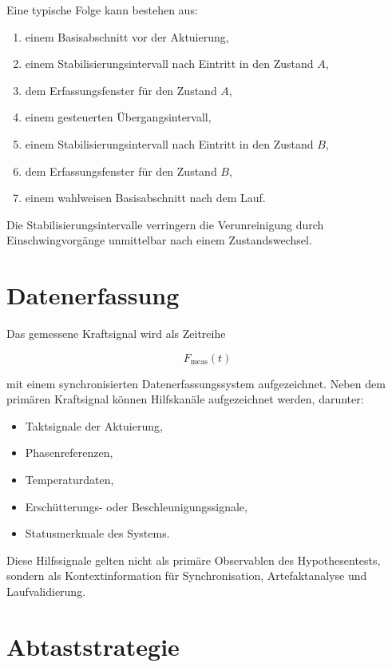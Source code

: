 \documentclass[12pt,a4paper]{report}
\begin{document}
Eine typische Folge kann bestehen aus:

\begin{enumerate}
\item einem Basisabschnitt vor der Aktuierung,
\item einem Stabilisierungsintervall nach Eintritt in den Zustand $A$,
\item dem Erfassungsfenster für den Zustand $A$,
\item einem gesteuerten Übergangsintervall,
\item einem Stabilisierungsintervall nach Eintritt in den Zustand $B$,
\item dem Erfassungsfenster für den Zustand $B$,
\item einem wahlweisen Basisabschnitt nach dem Lauf.
\end{enumerate}

Die Stabilisierungsintervalle verringern die Verunreinigung durch
Einschwingvorgänge unmittelbar nach einem Zustandswechsel.

\section{Datenerfassung}

Das gemessene Kraftsignal wird als Zeitreihe

\begin{equation}
F_{\text{meas}}(t)
\end{equation}

mit einem synchronisierten Datenerfassungssystem aufgezeichnet. Neben dem
primären Kraftsignal können Hilfskanäle aufgezeichnet werden, darunter:

\begin{itemize}
\item Taktsignale der Aktuierung,
\item Phasenreferenzen,
\item Temperaturdaten,
\item Erschütterungs- oder Beschleunigungssignale,
\item Statusmerkmale des Systems.
\end{itemize}

Diese Hilfssignale gelten nicht als primäre Observablen des
Hypothesentests, sondern als Kontextinformation für Synchronisation,
Artefaktanalyse und Laufvalidierung.

\section{Abtaststrategie}
\label{sec:abtaststrategie}
\end{document}
